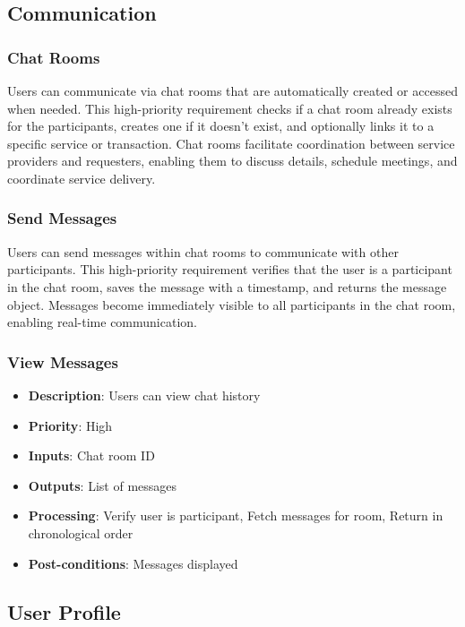 \documentclass[12pt,a4paper]{report}
\begin{document}
\subsection{Communication}

\subsubsection{Chat Rooms}

Users can communicate via chat rooms that are automatically created or accessed when needed. This high-priority requirement checks if a chat room already exists for the participants, creates one if it doesn't exist, and optionally links it to a specific service or transaction. Chat rooms facilitate coordination between service providers and requesters, enabling them to discuss details, schedule meetings, and coordinate service delivery.

\subsubsection{Send Messages}

Users can send messages within chat rooms to communicate with other participants. This high-priority requirement verifies that the user is a participant in the chat room, saves the message with a timestamp, and returns the message object. Messages become immediately visible to all participants in the chat room, enabling real-time communication.

\subsubsection{View Messages}
\begin{itemize}
    \item \textbf{Description}: Users can view chat history
    \item \textbf{Priority}: High
    \item \textbf{Inputs}: Chat room ID
    \item \textbf{Outputs}: List of messages
    \item \textbf{Processing}: Verify user is participant, Fetch messages for room, Return in chronological order
    \item \textbf{Post-conditions}: Messages displayed
\end{itemize}

\subsection{User Profile}
\end{document}
